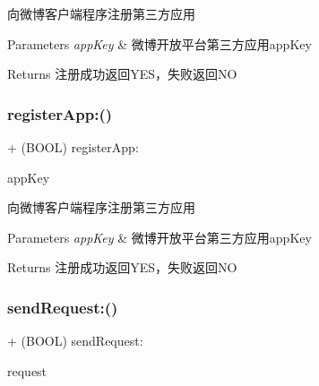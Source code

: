 向微博客户端程序注册第三方应用 
\begin{DoxyParams}{Parameters}
{\em app\+Key} & 微博开放平台第三方应用app\+Key \\
\hline
\end{DoxyParams}
\begin{DoxyReturn}{Returns}
注册成功返回\+Y\+E\+S，失败返回\+NO 
\end{DoxyReturn}
\mbox{\label{interface_weibo_s_d_k_ae11cd35ddd3b8ab9f0dea249e830aa72}} 
\subsubsection{\texorpdfstring{register\+App\+:()}{registerApp:()}\hspace{0.1cm}{\footnotesize\ttfamily [3/3]}}
{\footnotesize\ttfamily + (B\+O\+OL) register\+App\+: \begin{DoxyParamCaption}\item[{(N\+S\+String $\ast$)}]{app\+Key }\end{DoxyParamCaption}}

向微博客户端程序注册第三方应用 
\begin{DoxyParams}{Parameters}
{\em app\+Key} & 微博开放平台第三方应用app\+Key \\
\hline
\end{DoxyParams}
\begin{DoxyReturn}{Returns}
注册成功返回\+Y\+E\+S，失败返回\+NO 
\end{DoxyReturn}
\mbox{\label{interface_weibo_s_d_k_a765c7577fb1d6bf1e4ebf0ecdd4f6268}} 
\subsubsection{\texorpdfstring{send\+Request\+:()}{sendRequest:()}\hspace{0.1cm}{\footnotesize\ttfamily [1/3]}}
{\footnotesize\ttfamily + (B\+O\+OL) send\+Request\+: \begin{DoxyParamCaption}\item[{(\mbox{\hyperlink{interface_w_b_base_request}{W\+B\+Base\+Request}} $\ast$)}]{request }\end{DoxyParamCaption}}

